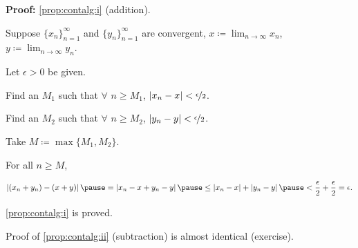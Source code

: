 \documentclass[10pt,aspectratio=149]{beamer}
\begin{document}
\begin{frame}

\textbf{Proof:}
\eqref{prop:contalg:i} (addition).

\pause
\medskip

Suppose $\{ x_n \}_{n=1}^\infty$ and $\{ y_n \}_{n=1}^\infty$ are convergent,
$\displaystyle x \coloneqq \lim_{n\to\infty} x_n$,
$\displaystyle y \coloneqq \lim_{n\to\infty} y_n$.

\pause
\medskip

Let $\epsilon > 0$ be given.  

\pause
Find an $M_1$ such that $\forall$ $n \geq M_1$,
$\left\lvert {x_n - x} \right\rvert < \nicefrac{\epsilon}{2}$.  

\pause
Find an $M_2$ such that $\forall$ $n \geq M_2$,
$\left\lvert {y_n - y} \right\rvert < \nicefrac{\epsilon}{2}$.

\pause
Take $M \coloneqq \max \{ M_1, M_2 \}$.

\pause
\medskip

For all $n \geq M$,

\pause
\medskip

$\displaystyle
\abs{(x_n+y_n) - (x+y)}
\pause
=
\abs{x_n-x + y_n-y}
\pause
\leq
\abs{x_n-x} + \abs{y_n-y}
\pause
<
\frac{\epsilon}{2} +
\frac{\epsilon}{2}
= \epsilon.
$

\medskip
\pause

\eqref{prop:contalg:i} is proved.

\medskip
\pause

Proof of \eqref{prop:contalg:ii} (subtraction) is almost identical
(exercise).

\end{frame}
\end{document}
